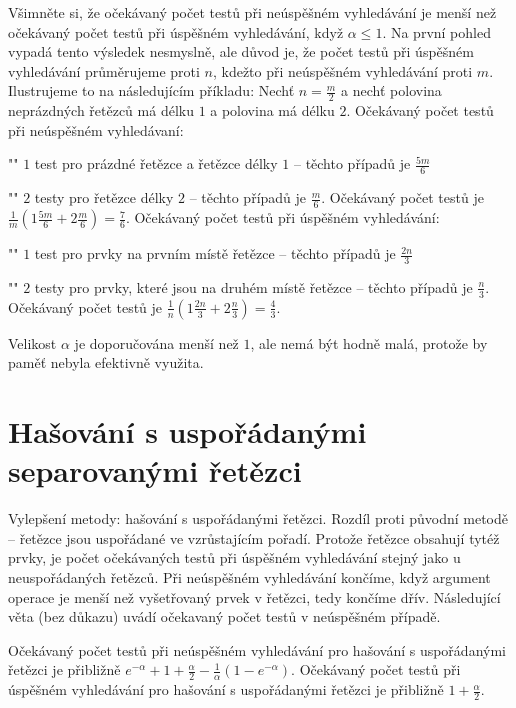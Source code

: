 \documentclass[a4paper,12pt]{article}
\begin{document}
Všimněte si, že očekávaný počet testů 
při neúspěšném vy\-hledávání je menší než očekávaný 
počet testů při úspěšném vy\-hledávání, když 
$\alpha\le 1$. Na první pohled vypadá tento výsledek nesmyslně, 
ale důvod je, že počet testů při 
úspěšném vy\-hledávání průměrujeme proti $
n$, 
kdežto při neúspěšném vy\-hledávání proti $
m$. Ilustrujeme 
to na následujícím příkladu:\newline 
Nech\v t $n=\frac m2$ a nech\v t polovina neprázdných 
řetězců má délku $1$ a polovina má délku $
2$. \newline 
Očekávaný počet testů při neúspěšném 
vyhledávaní:
\roster
\item"{}"
$1$ test pro prázdné řetězce a řetězce 
délky $1$ -- těchto případů je $\frac {5m}6$
\item"{}"
$2$ testy pro řetězce délky $2$ -- těchto případů je 
$\frac m6$.
\endroster
Očekávaný počet testů je 
$\frac 1m(1\frac {5m}6+2\frac m6)=\frac 76$.\newline 
Očekávaný počet testů při úspěšném 
vyhledávání: 
\roster
\item"{}"
$1$ test pro prvky na prvním místě řetězce -- těchto 
případů je $\frac {2n}3$
\item"{}"
$2$ testy pro prvky, které jsou na druhém místě řetězce -- těchto 
případů je $\frac n3$.
\endroster
Očekávaný počet testů je $\frac 1n(1\frac {2n}
3+2\frac n3)=\frac 43$.

Velikost $\alpha$ je doporučována menší než $
1$, ale nemá být 
hodně malá, protože by pamě\v t nebyla efektivně využita. 

\section{Hašování s uspořádanými separovanými řetězci}

Vylepšení metody: hašování s uspořádanými řetězci.
Rozdíl proti původní metodě -- řetězce jsou 
uspořádané ve vzrůsta\-jícím pořadí. Protože 
řetězce obsahují tytéž prvky, je počet očeká\-va\-ných testů 
při úspěšném vyhledávání stejný jako u ne\-uspořádaných 
řetězců. Při neúspěšném vyhledávání končíme, 
když argument operace je menší než vyšetřovaný prvek 
v řetěz\-ci, tedy končíme dřív. Následující věta (bez 
důkazu) uvádí očekavaný počet testů v 
neúspěšném případě.

Očekávaný počet testů při 
neúspěšném vyhledávání pro hašování s uspořá\-danými 
řetězci je přibližně $e^{-\alpha}+1+\frac {\alpha}
2-\frac 1{\alpha}(1-e^{-\alpha})$. Očekávaný 
počet testů při úspěšném vyhledávání pro 
hašování s uspořádanými řetězci je 
přibližně $1+\frac {\alpha}2.$
\endproclaim
\end{document}
